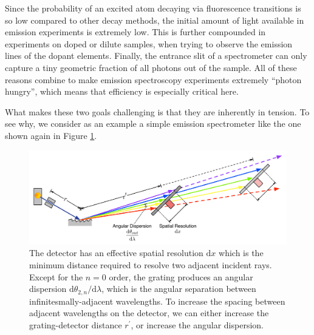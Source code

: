 Since the probability of an excited atom decaying via fluorescence transitions is so low compared to other decay methods, the initial amount of light available in emission experiments is extremely low.  This is further compounded in experiments on doped or dilute samples, when trying to observe the emission lines of the dopant elements.  Finally, the entrance slit of a spectrometer can only capture a tiny geometric fraction of all photons out of the sample.  All of these reasons combine to make emission spectroscopy experiments extremely ``photon hungry'', which means that efficiency is especially critical here.

What makes these two goals challenging is that they are inherently in tension.  To see why, we consider as an example a simple emission spectrometer like the one shown again in Figure \ref{1f}.

\begin{figure}[htbp] %
   \centering
   \hspace*{-0.4in}\includegraphics[scale=0.6]{../data/Chapter1/1f_spectrometerResolution/1f_2.pdf} 
   \caption{The detector has an effective spatial resolution $\mathrm{d}x$ which is the minimum distance required to resolve two adjacent incident rays.  Except for the $n=0$ order, the grating produces an angular dispersion $\mathrm{d}\theta_{2,n}/\mathrm{d}\lambda$, which is the angular separation between infinitesmally-adjacent wavelengths.  To increase the spacing between adjacent wavelengths on the detector, we can either increase the grating-detector distance $r^\prime$, or increase the angular dispersion. }
   \label{1f}
\end{figure}
               
